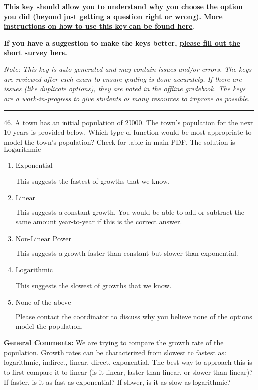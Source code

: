 \documentclass{extbook}[14pt]
\begin{document}
\textbf{This key should allow you to understand why you choose the option you did (beyond just getting a question right or wrong). \href{https://xronos.clas.ufl.edu/mac1105spring2020/courseDescriptionAndMisc/Exams/LearningFromResults}{More instructions on how to use this key can be found here}.}

\textbf{If you have a suggestion to make the keys better, \href{https://forms.gle/CZkbZmPbC9XALEE88}{please fill out the short survey here}.}

\textit{Note: This key is auto-generated and may contain issues and/or errors. The keys are reviewed after each exam to ensure grading is done accurately. If there are issues (like duplicate options), they are noted in the offline gradebook. The keys are a work-in-progress to give students as many resources to improve as possible.}

\rule{\textwidth}{0.4pt}

46. A town has an initial population of 20000. The town's population for the next 10 years is provided below. Which type of function would be most appropriate to model the town's population?
Check for table in main PDF. 
The solution is $ \text{Logarithmic} $ 

\begin{enumerate}[label=\Alph*.] 
\item $ \text{Exponential} $ 

 This suggests the fastest of growths that we know. 
\item $ \text{Linear} $ 

 This suggests a constant growth. You would be able to add or subtract the same amount year-to-year if this is the correct answer. 
\item $ \text{Non-Linear Power} $ 

 This suggests a growth faster than constant but slower than exponential. 
\item $ \text{Logarithmic} $ 

 This suggests the slowest of growths that we know. 
\item $ \text{None of the above} $ 

 Please contact the coordinator to discuss why you believe none of the options model the population. 
\end{enumerate} 
 
\textbf{General Comments:} We are trying to compare the growth rate of the population. Growth rates can be characterized from slowest to fastest as: logarithmic, indirect, linear, direct, exponential. The best way to approach this is to first compare it to linear (is it linear, faster than linear, or slower than linear)? If faster, is it as fast as exponential? If slower, is it as slow as logarithmic?
\end{document}

